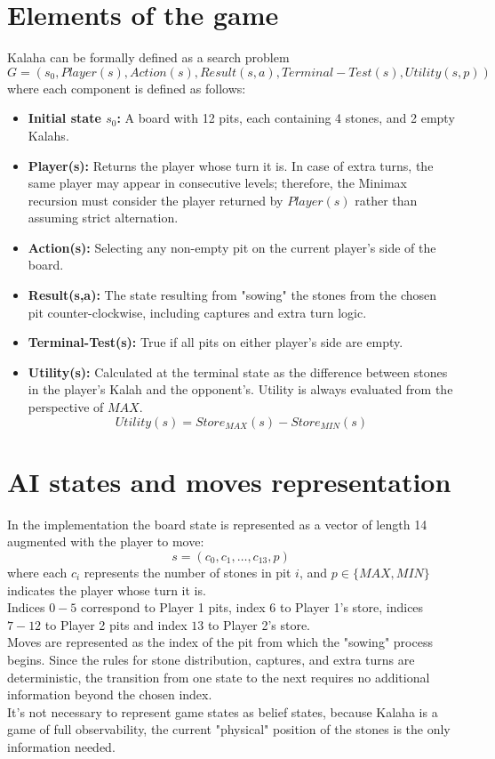 \documentclass[a4paper,11pt]{article}
\begin{document}
\section{Elements of the game}
Kalaha can be formally defined as a search problem
\[
G = (s_0, Player(s), Action(s), Result(s,a), Terminal-Test(s), Utility(s, p))
\]
where each component is defined as follows:
\begin{itemize}
    \item \textbf{Initial state $s_0$:} A board with 12 pits, each containing 4 stones, and 2 empty Kalahs.
    \item \textbf{Player(s):} Returns the player whose turn it is. In case of extra turns, the same player may appear in consecutive levels; therefore, the Minimax recursion must consider the player returned by $Player(s)$ rather than assuming strict alternation.
    \item \textbf{Action(s):} Selecting any non-empty pit on the current player's side of the board.
    \item \textbf{Result(s,a):} The state resulting from "sowing" the stones from the chosen pit counter-clockwise, including captures and extra turn logic.
    \item \textbf{Terminal-Test(s):} True if all pits on either player's side are empty.
    \item\textbf{Utility(s):} Calculated at the terminal state as the difference between stones in the player's Kalah and the opponent's. Utility is always evaluated from the perspective of $MAX$.
    \[
    Utility(s) = Store_{MAX}(s) - Store_{MIN}(s)
    \]
\end{itemize}


\section{AI states and moves representation}
In the implementation the board state is represented as a vector of length 14 augmented with the player to move:
\[
s = (c_0, c_1, \ldots, c_{13}, p)
\]
where each $c_i$ represents the number of stones in pit $i$, and $p \in \{MAX, MIN\}$ indicates the player whose turn it is. \\
Indices $0-5$ correspond to Player 1 pits, index $6$ to Player 1's store, indices $7-12$ to Player 2 pits and index $13$ to Player 2's store. \\
Moves are represented as the index of the pit from which the "sowing" process begins. Since the rules for stone distribution, captures, and extra turns are deterministic, the transition from one state to the next requires no additional information beyond the chosen index. \\
It's not necessary to represent game states as belief states, because Kalaha is a game of full observability, the current "physical" position of the stones is the only information needed.
\end{document}
